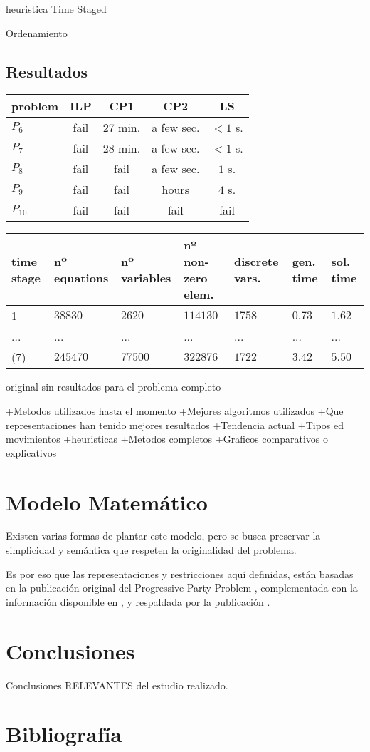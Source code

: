 \documentclass[letter, 10pt]{article}
\begin{document}
\cite{PPPAsMIP} heuristica Time Staged

\cite{FirstPublication} Ordenamiento
\subsection{Resultados}


\cite{LocalSearch}
\begin{tabular}{|l||c|c|c|c|}
\hline
problem & ILP & CP1 & CP2 & LS \\ \hline
$P_6$ & fail & 27 min. & a few sec. & $< 1$ s. \\ \hline
$P_7$ & fail & 28 min. & a few sec. & $< 1$ s. \\ \hline
$P_8$ & fail & fail & a few sec. & $1$ s. \\ \hline
$P_9$ & fail & fail & hours & $4$ s. \\ \hline
$P_10$ & fail & fail & fail & fail \\ \hline
\end{tabular}

\cite{PPPAsMIP}
\begin{tabular}{|p{0.8cm}|l|l|p{2cm}|p{1.2cm}|p{0.7cm}|p{0.7cm}|}
\hline
time stage & nº equations & nº variables & nº non-zero elem. & discrete vars. & gen. time & sol. time \\ \hline
1 & $38830$ & $2620$ & $114130$ & $1758$ & $0.73$ & $1.62$ \\ \hline
... & ... & ... & ... & ... & ... & ... \\ \hline
(7) & $245470$ & $77500$ & $322876$ & $1722$ & $3.42$ & $5.50$ \\ \hline
\end{tabular}


original sin resultados para el problema completo

+Metodos utilizados hasta el momento
+Mejores algoritmos utilizados
+Que representaciones han tenido mejores resultados
+Tendencia actual
+Tipos ed movimientos
+heuristicas
+Metodos completos
+Graficos comparativos o explicativos

\section{Modelo Matemático}
Existen varias formas de plantar este modelo, pero se busca preservar la simplicidad y semántica que respeten la originalidad del problema.

Es por eso que las representaciones y restricciones aquí definidas, están basadas en la publicación original del Progressive Party Problem \cite{FirstPublication}, complementada con la información disponible en \cite{CustomizingSearch}, y respaldada por la publicación \cite{PPPAsMIP}.

\section{Conclusiones}
Conclusiones RELEVANTES del estudio realizado.

\section{Bibliografía}


\end{document}
